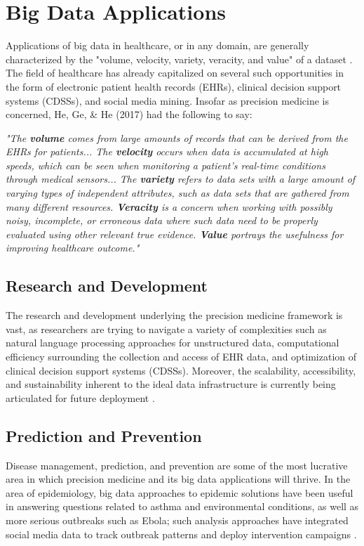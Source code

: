 \section{Big Data Applications}

Applications of big data in healthcare, or in any domain, are generally characterized by the "volume, velocity, variety, veracity, and value" of a dataset \cite{Jagadish2014}. The field of healthcare has already capitalized on several such opportunities in the form of electronic patient health records (EHRs), clinical decision support systems (CDSSs), and social media mining. Insofar as precision medicine is concerned, He, Ge, \& He (2017) had the following to say:

\textit{"The \textbf{volume} comes from large amounts of records that can be derived from the EHRs for patients... The \textbf{velocity} occurs when data is accumulated at high speeds, which can be seen when monitoring a patient’s real-time conditions through medical sensors... The \textbf{variety} refers to data sets with a large amount of varying types of independent attributes, such as data sets that are gathered from many different resources. \textbf{Veracity} is a concern when working with possibly noisy, incomplete, or erroneous data where such data need to be properly evaluated using other relevant true evidence. \textbf{Value} portrays the usefulness for improving healthcare outcome."} \cite{He2017}

\subsection{Research and Development}

The research and development underlying the precision medicine framework is vast, as researchers are trying to navigate a variety of complexities such as natural language processing approaches for unstructured data, computational efficiency surrounding the collection and access of EHR data, and optimization of clinical decision support systems (CDSSs). Moreover, the scalability, accessibility, and sustainability inherent to the ideal data infrastructure is currently being articulated for future deployment \cite{He2017}.

\subsection{Prediction and Prevention}

Disease management, prediction, and prevention are some of the most lucrative area in which precision medicine and its big data applications will thrive. In the area of epidemiology, big data approaches to epidemic solutions have been useful in answering questions related to asthma and environmental conditions, as well as more serious outbreaks such as Ebola; such analysis approaches have integrated social media data to track outbreak patterns and deploy intervention campaigns \cite{Leff2015}.

